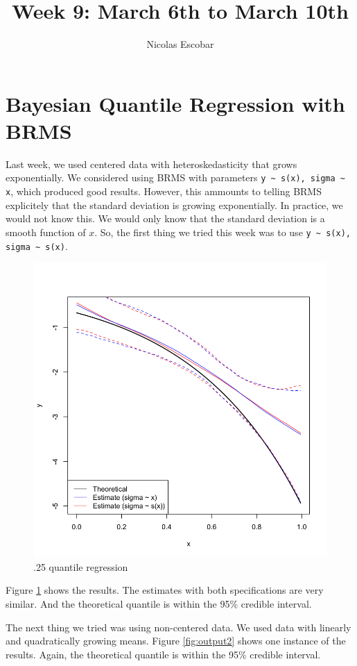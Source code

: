 \documentclass{article}
\title{Week 9: March 6th to March 10th}
\author{Nicolas Escobar}
\date{}
\begin{document}
\maketitle

\section{Bayesian Quantile Regression with BRMS}

Last week, we used centered data with heteroskedasticity that grows exponentially. 
We considered using BRMS with parameters \lstinline{y ~ s(x), sigma ~ x}, which produced good results. 
However, this ammounts to telling BRMS explicitely that the standard deviation is growing exponentially. 
In practice, we would not know this. We would only know that the standard deviation is a smooth function of $x$.
So, the first thing we tried this week was to use \lstinline{y ~ s(x), sigma ~ s(x)}.

\begin{figure}[ht]
    \centering
    \includegraphics[width=.8\textwidth]{output.png}
    \caption{.25 quantile regression}
    \label{fig:output}
\end{figure}

Figure \ref{fig:output} shows the results. The estimates with both specifications are very similar.
And the theoretical quantile is within the 95\% credible interval.

The next thing we tried was using non-centered data. We used data with linearly and quadratically growing means. 
Figure \ref{fig:output2} shows one instance of the results. 
Again, the theoretical quantile is within the 95\% credible interval.
\end{document}
